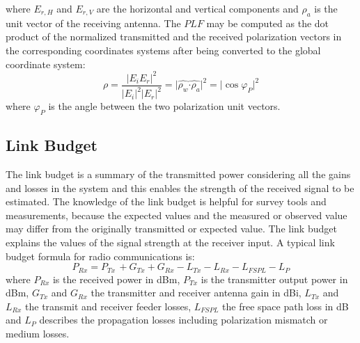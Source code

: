 where  $E_{r,H}$ and $E_{r,V}$ are the horizontal and vertical components and $\widehat{ \rho _{a}}$ is the unit vector of the receiving antenna. The $PLF$ may be computed as the dot product of the normalized transmitted and the received polarization vectors in the corresponding coordinates systems after being converted to the global coordinate system:
\begin{equation}
\rho =\frac{ \vert E_{i}E_{r} \vert ^{2}}{ \vert E_{i} \vert ^{2} \vert E_{r} \vert ^{2}}=  \vert \widehat{ \rho _{w}}\widehat{ \cdot  \rho _{a}} \vert ^{2}=  \vert \cos  \varphi _{P} \vert ^{2}
\end{equation}
where $\varphi _{P}$ is the angle between the two polarization unit vectors.





\subsection{Link Budget}

The link budget is a summary of the transmitted power considering all the gains and losses in the system and this enables the strength of the received signal to be estimated. The knowledge of the link budget is helpful for survey tools and measurements, because the expected values and the measured or observed value may differ from the originally transmitted or expected value. The link budget explains the values of the signal strength at the receiver input. A typical link budget formula for radio communications is:
\begin{equation}
P_{Rx}= P_{Tx~}+G_{Tx}+ G_{Rx}-L_{Tx}-L_{Rx}-L_{FSPL}-L_{P} \label{link_budget}
\end{equation}
where $P_{Rx}$ is the received power in dBm, $P_{Tx}$ is the transmitter output power in dBm, $G_{Tx}$ and $G_{Rx}$ the transmitter and receiver antenna gain in dBi, $L_{Tx}$ and $L_{Rx}$ the transmit and receiver feeder losses, $L_{FSPL}$ the free space path loss in dB and $L_{P}$ describes the propagation losses including polarization mismatch or medium losses.

